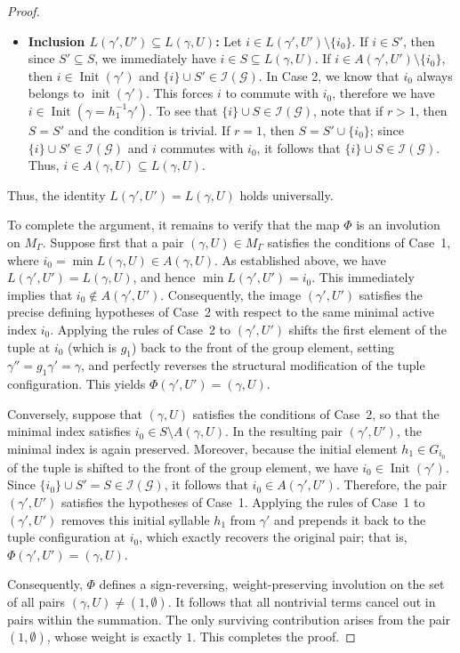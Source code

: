 \documentclass[11pt,reqno]{amsart}
\numberwithin{equation}{section} %
\theoremstyle{definition}
\theoremstyle{remark}
\numberwithin{equation}{section}
\begin{document}
\begin{proof}
\begin{itemize}
    \medskip
    \item \textbf{Inclusion $L(\gamma', U') \subseteq L(\gamma, U)$:} Let $i \in L(\gamma', U') \setminus \{i_0\}$. If $i \in S'$, then since $S' \subseteq S$, we immediately have $i \in S \subseteq L(\gamma, U)$. If $i \in A(\gamma', U') \setminus \{i_0\}$, then $i \in \operatorname{Init}(\gamma')$ and $\{i\} \cup S' \in \mathcal{I}(\mathcal{G})$. In Case 2, we know that $i_0$ always belongs to $ \operatorname{init}(\gamma')$. This forces $i$ to commute with $i_0$, therefore we have  $i \in \operatorname{Init}(\gamma = h_1^{-1} \gamma')$. To see that $\{i\} \cup S \in \mathcal{I}(\mathcal{G})$, note that if $r > 1$, then $S = S'$ and the condition is trivial. If $r = 1$, then $S = S' \cup \{i_0\}$; since $\{i\} \cup S' \in \mathcal{I}(\mathcal{G})$ and $i$ commutes with $i_0$, it follows that $\{i\} \cup S \in \mathcal{I}(\mathcal{G})$. Thus, $i \in A(\gamma, U) \subseteq L(\gamma, U)$.
\end{itemize}
Thus, the identity $L(\gamma', U') = L(\gamma, U)$ holds universally.

To complete the argument, it remains to verify that the map $\Phi$ is an involution on $M_\Gamma$. Suppose first that a pair $(\gamma,U) \in M_\Gamma$ satisfies the conditions of Case~1, where $i_0 = \min L(\gamma,U) \in A(\gamma,U)$. As established above, we have  $L(\gamma', U') = L(\gamma, U)$, and hence $\min L(\gamma', U') = i_0$. This immediately implies that $i_0 \notin A(\gamma',U')$. Consequently, the image $(\gamma', U')$ satisfies the precise defining hypotheses of Case~2 with respect to the same minimal active index $i_0$. Applying the rules of Case~2 to $(\gamma', U')$ shifts the first element of the tuple at $i_0$ (which is $g_1$) back to the front of the group element, setting $\gamma'' = g_1\gamma' = \gamma$, and perfectly reverses the structural modification of the tuple configuration. This yields $\Phi(\gamma', U') = (\gamma, U)$.

Conversely, suppose that $(\gamma,U)$ satisfies the conditions of Case~2, so that the minimal index satisfies $i_0 \in S \setminus A(\gamma,U)$. In the resulting pair $(\gamma',U')$, the minimal index is again preserved. Moreover, because the initial element $h_1 \in G_{i_0}$ of the tuple is shifted to the front of the group element, we have $i_0 \in \operatorname{Init}(\gamma')$. Since $\{i_0\} \cup S' = S \in \mathcal{I}(\mathcal{G})$, it follows that $i_0 \in A(\gamma',U')$. Therefore, the pair $(\gamma',U')$ satisfies the hypotheses of Case~1. Applying the rules of Case~1 to $(\gamma',U')$ removes this initial syllable $h_1$ from $\gamma'$ and prepends it back to the tuple configuration at $i_0$, which exactly recovers the original pair; that is, $\Phi(\gamma', U') = (\gamma, U)$.

Consequently, $\Phi$ defines a sign-reversing, weight-preserving involution on the set of all pairs $(\gamma, U) \neq (1, \emptyset)$. It follows that all nontrivial terms cancel out in pairs within the summation. The only surviving contribution arises from the pair $(1, \emptyset)$, whose weight is exactly $1$. This completes the proof.
\end{proof}
\end{document}
